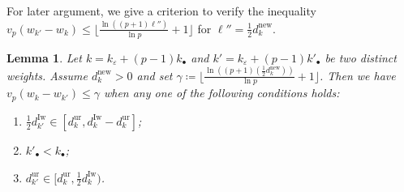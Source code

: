 \documentclass[12pt]{amsart}
\newcommand{\bin}[1]{{\color{red} \sf $\heartsuit\heartsuit\heartsuit$ Bin: [#1]}}
\newtheorem{lemma}[subsection]{Lemma}
\theoremstyle{definition}
\numberwithin{equation}{subsection}
\newcommand{\new}{\mathrm{new}}
\newcommand{\Iw}{\mathrm{Iw}}
\newcommand{\ur}{\mathrm{ur}}
\begin{document}
For later argument, we give a criterion to verify the inequality $v_p(w_{k'}-w_k) \leq \big\lfloor \frac{\ln((p+1)\ell'')}{\ln p}+1\big\rfloor $ for $\ell''=\frac 12 d_k^\new$.

\begin{lemma}
    \label{L:criterion to determine vp(wk-wk') leq gamma}
Let $k = k_\varepsilon + (p-1)k_{\bullet}$ and $k' = k_\varepsilon + (p-1)k'_{\bullet}$ be two distinct weights. Assume $d_k^\new >0$ and set $\gamma\coloneqq \lfloor \frac{\ln ((p+1)(\frac 12 d_k^\new))}{\ln p}+1 \rfloor$. Then we have  $v_p(w_k-w_{k'})\leq \gamma$  when any one of the following conditions holds:
        \begin{enumerate}
            \item $\frac 12 d_{k'}^\Iw\in [d_k^\ur,d_k^\Iw-d_k^\ur]$;
            \item $k'_\bullet<k_\bullet$;
            \item $d_{k'}^\ur\in [d_k^\ur,\tfrac 12 d_k^\Iw)$.
        \end{enumerate}
\end{lemma}
\end{document}
